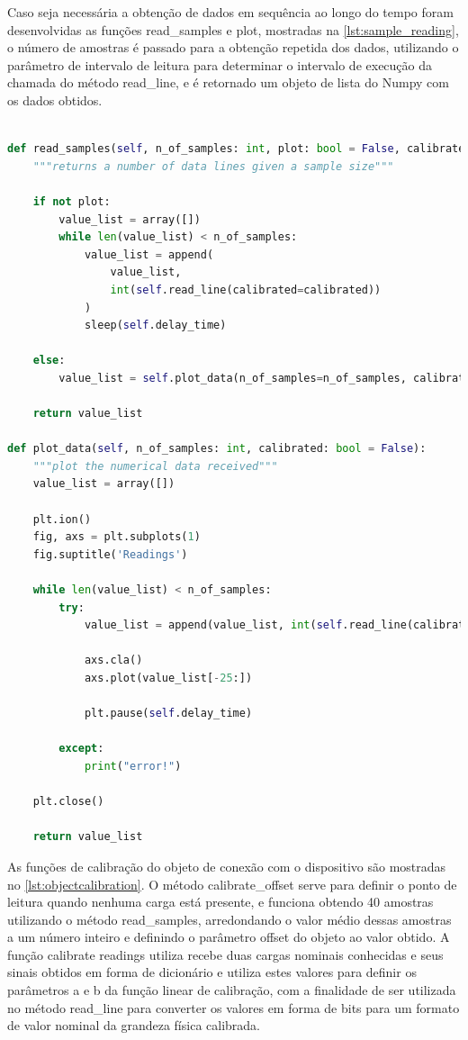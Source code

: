 Caso seja necessária a obtenção de dados em sequência ao longo do tempo foram desenvolvidas as funções read\_samples e plot, mostradas na \autoref{lst:sample_reading},
o número de amostras é passado para a obtenção repetida dos dados, utilizando o parâmetro de intervalo de leitura para determinar o intervalo de execução da chamada do
método read\_line, e é retornado um objeto de lista do Numpy com os dados obtidos.

\begin{lstlisting}[language=Python,label={lst:sample_reading},caption={[Network Device calibrate offset]{Métodos para executar experimentos do objeto NetworkDevice}}]

def read_samples(self, n_of_samples: int, plot: bool = False, calibrated: bool = False):
	"""returns a number of data lines given a sample size"""

	if not plot:
		value_list = array([])
		while len(value_list) < n_of_samples:
			value_list = append(
				value_list,
				int(self.read_line(calibrated=calibrated))
			)
			sleep(self.delay_time)

	else:
		value_list = self.plot_data(n_of_samples=n_of_samples, calibrated=calibrated)

	return value_list

def plot_data(self, n_of_samples: int, calibrated: bool = False):
	"""plot the numerical data received"""
	value_list = array([])

	plt.ion()
	fig, axs = plt.subplots(1)
	fig.suptitle('Readings')

	while len(value_list) < n_of_samples:
		try:
			value_list = append(value_list, int(self.read_line(calibrated=calibrated)))

			axs.cla()
			axs.plot(value_list[-25:])

			plt.pause(self.delay_time)

		except:
			print("error!")

	plt.close()

	return value_list

\end{lstlisting}

As funções de calibração do objeto de conexão com o dispositivo são mostradas no \autoref{lst:objectcalibration}. O método calibrate\_offset serve para definir o ponto de leitura quando
nenhuma carga está presente, e funciona obtendo 40 amostras utilizando o método read\_samples, arredondando o valor médio dessas amostras a um número inteiro e definindo o parâmetro
offset do objeto ao valor obtido. A função calibrate readings utiliza recebe duas cargas nominais conhecidas e seus sinais obtidos em forma de dicionário e utiliza estes valores para
definir os parâmetros a e b da função linear de calibração, com a finalidade de ser utilizada no método read\_line para converter os valores em forma de bits para um formato de valor
nominal da grandeza física calibrada.


